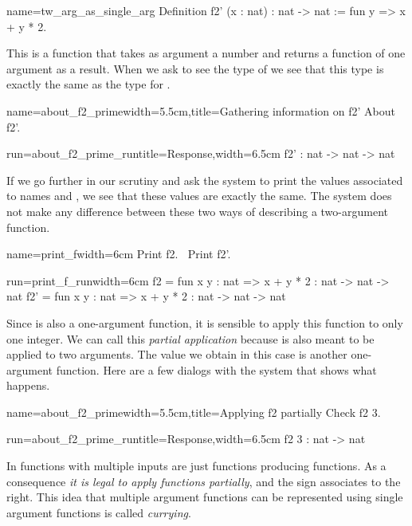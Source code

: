 \begin{coq}{name=tw_arg_as_single_arg}{}
Definition f2' (x : nat) : nat -> nat := fun y => x + y * 2.
\end{coq}
This is a function that takes as argument a number  and returns
a function of one argument as a result.  When we ask to see the type
of  we see that this type is exactly the same as the type for
.

\begin{coq}{name=about_f2_prime}{width=5.5cm,title=Gathering information on f2'}
About f2'.
\end{coq}
\begin{coqout}{run=about_f2_prime_run}{title=Response,width=6.5cm}
f2' : nat -> nat -> nat
\end{coqout}

If we go further in our scrutiny and ask the \Coq{} system to print
the values associated to names  and , we see that these
values are exactly the same.  The \Coq{} system does not make any
difference between these two ways of describing a two-argument function.

\begin{coq}{name=print_f}{width=6cm}
Print f2.
$~$
Print f2'.
$~$
\end{coq}
\begin{coqout}{run=print_f_run}{width=6cm}
f2 = fun x y : nat => x + y * 2
  : nat -> nat -> nat
f2' = fun x y : nat => x + y * 2
  : nat -> nat -> nat
\end{coqout}

Since  is also a one-argument function, it is sensible to apply this
function to only one integer.  We can call this {\em partial application}
because  is also meant to be applied to two arguments.
 The value we obtain in this case is another
one-argument function.  Here are a few dialogs with the \Coq{} system 
that shows what happens.

\begin{coq}{name=about_f2_prime}{width=5.5cm,title=Applying f2 partially}
Check f2 3.
\end{coq}
\begin{coqout}{run=about_f2_prime_run}{title=Response,width=6.5cm}
f2 3 : nat -> nat
\end{coqout}

In \Coq{} functions with multiple inputs are just functions producing
functions.  As a consequence \emph{it is legal to apply functions partially},
and the \C{->} sign associates to the right.
This idea that multiple argument functions can be represented using
single argument functions is called {\em currying}.

